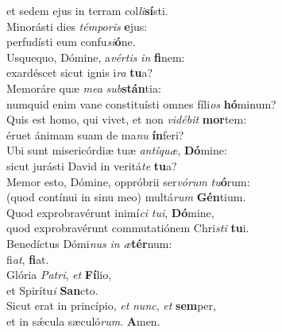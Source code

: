 \oddverse et sedem ejus in terram col\textit{li}\textbf{sí}sti.\\
\evenverse Minorásti dies \textit{tém}\textit{po}\textit{ris} \textbf{e}jus:~\*\\
\evenverse perfudísti eum confu\textit{si}\textbf{ó}ne.\\
\oddverse Usquequo, Dómine, a\textit{vér}\textit{tis} \textit{in} \textbf{fi}nem:~\*\\
\oddverse exardéscet sicut ignis i\textit{ra} \textbf{tu}a?\\
\evenverse Memoráre quæ \textit{me}\textit{a} \textit{sub}\textbf{stán}tia:~\*\\
\evenverse numquid enim vane constituísti omnes fíli\textit{os} \textbf{hó}minum?\\
\oddverse Quis est homo, qui vivet, et non \textit{vi}\textit{dé}\textit{bit} \textbf{mor}tem:~\*\\
\oddverse éruet ánimam suam de ma\textit{nu} \textbf{ín}feri?\\
\evenverse Ubi sunt misericórdiæ tuæ \textit{an}\textit{tí}\textit{quæ}, \textbf{Dó}mine:~\*\\
\evenverse sicut jurásti David in veritá\textit{te} \textbf{tu}a?\\
\oddverse Memor esto, Dómine, oppróbrii ser\textit{vó}\textit{rum} \textit{tu}\textbf{ó}rum:~\*\\
\oddverse (quod contínui in sinu meo) multá\textit{rum} \textbf{Gén}tium.\\
\evenverse Quod exprobravérunt inimí\textit{ci} \textit{tu}\textit{i}, \textbf{Dó}mine,~\*\\
\evenverse quod exprobravérunt commutatiónem Chri\textit{sti} \textbf{tu}i.\\
\oddverse Benedíctus Dómi\textit{nus} \textit{in} \textit{æ}\textbf{tér}num:~\*\\
\oddverse fi\textit{at}, \textbf{fi}at.\\
\evenverse Glória \textit{Pa}\textit{tri}, \textit{et} \textbf{Fí}lio,~\*\\
\evenverse et Spirítu\textit{i} \textbf{San}cto.\\
\oddverse Sicut erat in princípio, \textit{et} \textit{nunc}, \textit{et} \textbf{sem}per,~\*\\
\oddverse et in sǽcula sæculó\textit{rum}. \textbf{A}men.\\
